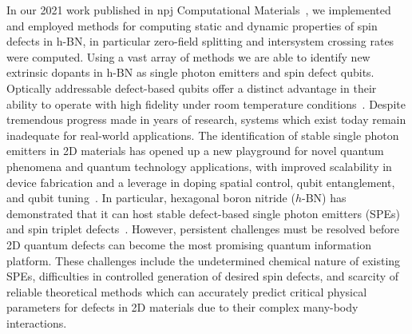 In our 2021 work published in npj Computational Materials~\cite{smart2021intersystem}, we implemented and employed methods for computing static and dynamic properties of spin defects in h-BN, in particular zero-field splitting and intersystem crossing rates were computed. Using a vast array of methods we are able to identify new extrinsic dopants in h-BN as single photon emitters and spin defect qubits.
Optically addressable defect-based qubits offer a distinct advantage in their ability to operate with high fidelity under room temperature conditions~\cite{koehl2011room,weber2010quantum}.
Despite tremendous progress made in years of research, systems which exist today remain inadequate for real-world applications. The identification of stable single photon emitters in 2D materials has opened up a new playground for novel quantum phenomena and quantum technology applications, with improved scalability in device fabrication and
a leverage in doping spatial control, qubit entanglement, and qubit tuning~\cite{liu20192d,aharonovich2017quantum}.
In particular, hexagonal boron nitride ($h$-BN) has demonstrated that it can host stable defect-based single photon emitters (SPEs)~\cite{mendelson2020strain,feldman2019phonon,yim2020polarization,mackoit2019carbon} and spin triplet defects~\cite{kianinia2020generation,turiansky2020spinning}.
However,
persistent challenges must be resolved before 2D quantum defects can become the most promising quantum information platform. These challenges include the undetermined chemical nature of
existing SPEs\cite{li2017nonmagnetic,yim2020polarization}, difficulties in controlled generation of desired spin defects, and scarcity of reliable theoretical methods which
can accurately predict critical physical parameters for defects in 2D materials due to their complex many-body interactions.

